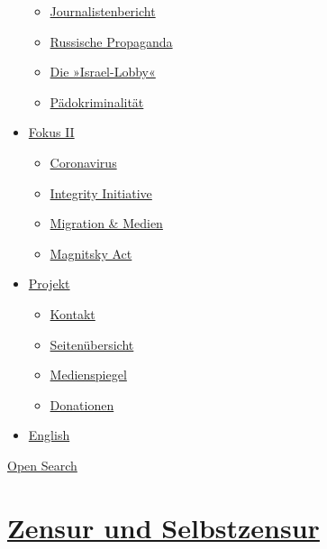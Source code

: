 \begin{itemize}
  \begin{itemize}
  \tightlist
  \item
    \href{https://swprs.org/bericht-eines-journalisten/}{Journalistenbericht}
  \item
    \href{https://swprs.org/russische-propaganda/}{Russische Propaganda}
  \item
    \href{https://swprs.org/die-israel-lobby-fakten-und-mythen/}{Die
    »Israel-Lobby«}
  \item
    \href{https://swprs.org/geopolitik-und-paedokriminalitaet/}{Pädokriminalität}
  \end{itemize}
\item
  \href{https://swprs.org/migration-und-medien/}{Fokus II}

  \begin{itemize}
  \tightlist
  \item
    \href{https://swprs.org/covid-19-hinweis-ii/}{Coronavirus}
  \item
    \href{https://swprs.org/die-integrity-initiative/}{Integrity
    Initiative}
  \item
    \href{https://swprs.org/migration-und-medien/}{Migration \& Medien}
  \item
    \href{https://swprs.org/der-fall-magnitsky/}{Magnitsky Act}
  \end{itemize}
\item
  \href{https://swprs.org/kontakt/}{Projekt}

  \begin{itemize}
  \tightlist
  \item
    \href{https://swprs.org/kontakt/}{Kontakt}
  \item
    \href{https://swprs.org/uebersicht/}{Seitenübersicht}
  \item
    \href{https://swprs.org/medienspiegel/}{Medienspiegel}
  \item
    \href{https://swprs.org/donationen/}{Donationen}
  \end{itemize}
\item
  \href{https://swprs.org/contact/}{English}
\end{itemize}

\protect\hyperlink{}{Open Search}

\hypertarget{zensur-und-selbstzensur}{%
\section{\texorpdfstring{\href{https://swprs.org/2017/03/01/zensur-in-schweizer-medien/}{Zensur
und
Selbstzensur}}{Zensur und Selbstzensur}}\label{zensur-und-selbstzensur}}

